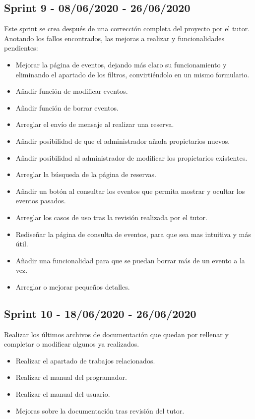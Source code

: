 \subsection{Sprint 9 - 08/06/2020 - 26/06/2020}
Este sprint se crea después de una corrección completa del proyecto por el tutor. Anotando los fallos encontrados, las mejoras a realizar y funcionalidades pendientes:
\begin{itemize}
    \item Mejorar la página de eventos, dejando más claro su funcionamiento y eliminando el apartado de los filtros, convirtiéndolo en un mismo formulario.
    \item Añadir función de modificar eventos.
    \item Añadir función de borrar eventos.
    \item Arreglar el envío de mensaje al realizar una reserva.
    \item Añadir posibilidad de que el administrador añada propietarios nuevos.
    \item Añadir posibilidad al administrador de modificar los propietarios existentes.
    \item Arreglar la búsqueda de la página de reservas.
    \item Añadir un botón al consultar los eventos que permita mostrar y ocultar los eventos pasados.
    \item Arreglar los casos de uso tras la revisión realizada por el tutor.
    \item Rediseñar la página de consulta de eventos, para que sea mas intuitiva y más útil.
    \item Añadir una funcionalidad para que se puedan borrar más de un evento a la vez.
    \item Arreglar o mejorar pequeños detalles.
\end{itemize}

\subsection{Sprint 10 - 18/06/2020 - 26/06/2020 }
Realizar los últimos archivos de documentación que quedan por rellenar y completar o modificar algunos ya realizados.
\begin{itemize}
    \item Realizar el apartado de trabajos relacionados.
    \item Realizar el manual del programador.
    \item Realizar el manual del usuario.
    \item Mejoras sobre la documentación tras revisión del tutor.
\end{itemize}
